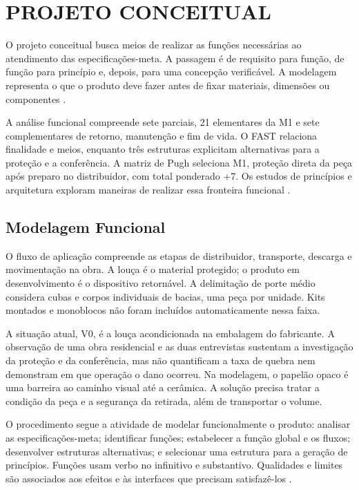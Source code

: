 \clearpage
\section{PROJETO CONCEITUAL}

O projeto conceitual busca meios de realizar as funções necessárias ao atendimento das especificações-meta. A passagem é de requisito para função, de função para princípio e, depois, para uma concepção verificável. A modelagem representa o que o produto deve fazer antes de fixar materiais, dimensões ou componentes \citep{back2008,rozenfeld2006}.

A análise funcional compreende sete parciais, 21 elementares da M1 e sete complementares de retorno, manutenção e fim de vida. O FAST relaciona finalidade e meios, enquanto três estruturas explicitam alternativas para a proteção e a conferência. A matriz de Pugh seleciona M1, proteção direta da peça após preparo no distribuidor, com total ponderado +7. Os estudos de princípios e arquitetura exploram maneiras de realizar essa fronteira funcional \citep{equipeconceitual2026,planilhapsp62026}.

\subsection{Modelagem Funcional}

O fluxo de aplicação compreende as etapas de distribuidor, transporte, descarga e movimentação na obra. A louça é o material protegido; o produto em desenvolvimento é o dispositivo retornável. A delimitação de porte médio considera cubas e corpos individuais de bacias, uma peça por unidade. Kits montados e monoblocos não foram incluídos automaticamente nessa faixa.

A situação atual, V0, é a louça acondicionada na embalagem do fabricante. A observação de uma obra residencial e as duas entrevistas sustentam a investigação da proteção e da conferência, mas não quantificam a taxa de quebra nem demonstram em que operação o dano ocorreu. Na modelagem, o papelão opaco é uma barreira ao caminho visual até a cerâmica. A solução precisa tratar a condição da peça e a segurança da retirada, além de transportar o volume.

O procedimento segue a atividade de modelar funcionalmente o produto: analisar as especificações-meta; identificar funções; estabelecer a função global e os fluxos; desenvolver estruturas alternativas; e selecionar uma estrutura para a geração de princípios. Funções usam verbo no infinitivo e substantivo. Qualidades e limites são associados aos efeitos e às interfaces que precisam satisfazê-los \citep{aulasmodelagem}.

